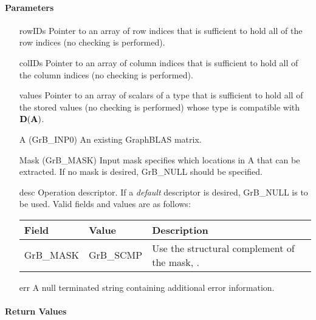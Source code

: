 \paragraph{Parameters}

\begin{itemize}[leftmargin=1.1in]
    \item[{\sf rowIDs}] Pointer to an array of row indices that is sufficient to
                        hold all of the row indices (no checking is performed).
    \item[{\sf colIDs}] Pointer to an array of column indices that is sufficient to
                        hold all of the column indices (no checking is performed). 
    \item[{\sf values}] Pointer to an array of scalars of a type that is sufficient to
                        hold all of the stored values (no checking is performed) whose
                        type is compatible with $\bold{D}({\bf A})$.
    \item[{\sf A}]      ({\sf GrB\_INP0}) An existing GraphBLAS matrix.
    \item[{\sf Mask}]   ({\sf GrB\_MASK}) Input mask specifies which locations in
                        {\sf A} that can be extracted.  If no mask is desired,
                        {\sf GrB\_NULL} should be specified.
    \item[{\sf desc}]   Operation descriptor. If a
    \emph{default} descriptor is desired, {\sf GrB\_NULL} is to be
    used.  Valid fields and values are as follows: \\
    \begin{tabular}{llp{3in}}
    Field  & Value & Description \\
    \hline
    {\sf GrB\_MASK} & {\sf GrB\_SCMP}   & Use the structural complement of the mask, . \\
    \end{tabular}
    \item[{\sf err}]     A null terminated string containing additional error information.
\end{itemize}

\paragraph{Return Values}

